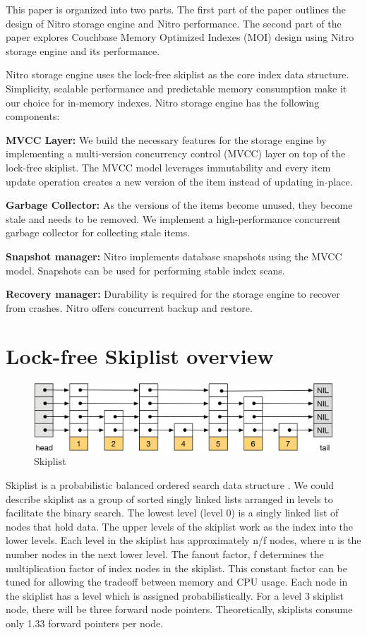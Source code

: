 \documentclass{vldb}
\begin{document}
This paper is organized into two parts. The first part of the paper outlines the design of Nitro storage engine and Nitro performance. The second part of the paper explores Couchbase Memory Optimized Indexes (MOI) design using Nitro storage engine and its performance.

Nitro storage engine uses the lock-free skiplist as the core index data structure. Simplicity, scalable performance and predictable memory consumption make it our choice for in-memory indexes. Nitro storage engine has the following components:

\textbf{MVCC Layer:} We build the necessary features for the storage engine by implementing a multi-version concurrency control (MVCC) layer on top of the lock-free skiplist. The MVCC model leverages immutability and every item update operation creates a new version of the item instead of updating in-place. 

\textbf{Garbage Collector:} As the versions of the items become unused, they become stale and needs to be removed. We implement a high-performance concurrent garbage collector for collecting stale items.

\textbf{Snapshot manager:} Nitro implements database snapshots using the MVCC model. Snapshots can be used for performing stable index scans.

\textbf{Recovery manager:} Durability is required for the storage engine to recover from crashes. Nitro offers concurrent backup and restore.

\section{Lock-free Skiplist overview}

\begin{figure}[h]
\includegraphics[scale=0.4]{images/fig-2}
\caption{Skiplist}
\label{fig:skiplist}
\end{figure}
Skiplist is a probabilistic balanced ordered search data structure \cite{pugh:skiplist}. We could describe skiplist as a group of sorted singly linked lists arranged in levels to facilitate the binary search. The lowest level (level 0) is a singly linked list of nodes that hold data. The upper levels of the skiplist work as the index into the lower levels. Each level in the skiplist has approximately n/f nodes, where n is the number nodes in the next lower level. The fanout factor, f determines the multiplication factor of index nodes in the skiplist. This constant factor can be tuned for allowing the tradeoff between memory and CPU usage. Each node in the skiplist has a level which is assigned probabilistically. For a level 3 skiplist node, there will be three forward node pointers. Theoretically, skiplists consume only 1.33 forward pointers per node.
\end{document}
